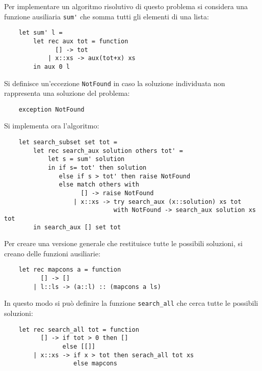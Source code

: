 \documentclass{article}
\numberwithin{equation}{subsection}
\begin{document}
Per implementare un algoritmo risolutivo di questo problema si considera una funzione ausiliaria \verb|sum'| che somma tutti gli elementi di una lista:
\begin{verbatim}
    let sum' l =
        let rec aux tot = function
              [] -> tot
            | x::xs -> aux(tot+x) xs
        in aux 0 l
\end{verbatim}

Si definisce un'eccezione \verb|NotFound| in caso la soluzione individuata non rappresenta una soluzione del problema:
\begin{verbatim}
    exception NotFound
\end{verbatim}
Si implementa ora l'algoritmo:
\begin{verbatim}
    let search_subset set tot = 
        let rec search_aux solution others tot' =
            let s = sum' solution
            in if s= tot' then solution
               else if s > tot' then raise NotFound
               else match others with
                     [] -> raise NotFound
                   | x::xs -> try search_aux (x::solution) xs tot
                              with NotFound -> search_aux solution xs tot
        in search_aux [] set tot
\end{verbatim}



Per creare una versione generale che restituisce tutte le possibili soluzioni, si creano delle funzioni ausiliarie:
\begin{verbatim}
    let rec mapcons a = function
          [] -> []
        | l::ls -> (a::l) :: (mapcons a ls)
\end{verbatim}

In questo modo si può definire la funzione \verb|search_all| che cerca tutte le possibili soluzioni:
\begin{verbatim}
    let rec search_all tot = function
          [] -> if tot > 0 then []
                else [[]] 
        | x::xs -> if x > tot then serach_all tot xs
                   else mapcons 
\end{verbatim}
\end{document}
